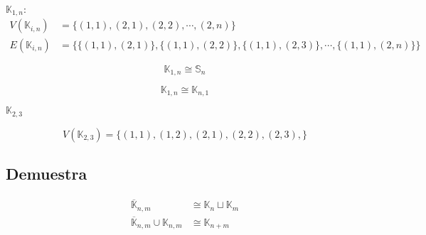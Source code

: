 \documentclass[../main.tex]{subfiles}
\begin{document}
$\mathbb{K}_{1,n}$:
\begin{align*}
	V(\mathbb{K}_{i,n}) &=
	\{
		(1,1),
		(2,1),
		(2,2),
		\cdots,
		(2,n)
	\}\\
	E(\mathbb{K}_{i,n}) &=
	\{
		\{(1,1),(2,1)\},
		\{(1,1),(2,2)\},
		\{(1,1),(2,3)\},
		\cdots,
		\{(1,1),(2,n)\}
	\}
\end{align*}

\[
	\mathbb{K}_{1,n} \cong \mathbb{S}_n
\]

\begin{figure}[H]
	\centering
	
\end{figure}

\[
	\mathbb{K}_{1,n}
	\cong
	\mathbb{K}_{n,1}
\]

$\mathbb{K}_{2,3}$

\[
	V(\mathbb{K}_{2,3})=
	\{
		(1,1),
		(1,2),
		(2,1),
		(2,2),
		(2,3),
	\}
\]

\begin{figure}[H]
	\centering
	
\end{figure}

\subsection*{Demuestra}%
\begin{align*}
	\overline{\mathbb{K}}_{n,m} &\cong \mathbb{K}_n \sqcup \mathbb{K}_m\\
	\overline{\mathbb{K}}_{n,m} \cup \mathbb{K}_{n,m} &\cong \mathbb{K}_{n+m}
\end{align*}
\end{document}
